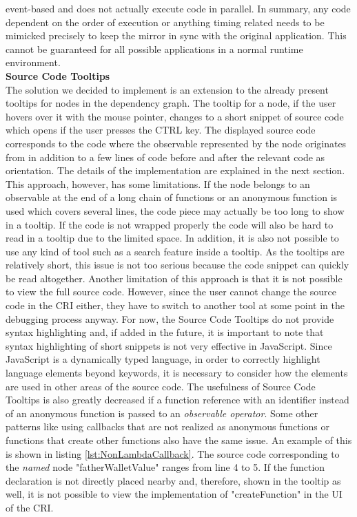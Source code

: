 event-based \cite{EventBasedJS} and does not actually execute code in parallel. In summary, any code dependent on the order of execution or anything timing related needs to be mimicked precisely to keep the mirror in sync with the original application. This cannot be guaranteed for all possible applications in a normal runtime environment. \\
 
\noindent\textbf{Source Code Tooltips}\\
The solution we decided to implement is an extension to the already present tooltips for nodes in the dependency graph. The tooltip for a node, if the user hovers over it with the mouse pointer, changes to a short snippet of source code which opens if the user presses the CTRL key. The displayed source code corresponds to the code where the observable represented by the node originates from in addition to a few lines of code before and after the relevant code as orientation. The details of the implementation are explained in the next section. This approach, however, has some limitations. If the node belongs to an observable at the end of a long chain of functions or an anonymous function is used which covers several lines, the code piece may actually be too long to show in a tooltip. If the code is not wrapped properly the code will also be hard to read in a tooltip due to the limited space. In addition, it is also not possible to use any kind of tool such as a search feature inside a tooltip. As the tooltips are relatively short, this issue is not too serious because the code snippet can quickly be read altogether. Another limitation of this approach is that it is not possible to view the full source code. However, since the user cannot change the source code in the CRI either, they have to switch to another tool at some point in the debugging process anyway. For now, the Source Code Tooltips do not provide syntax highlighting and, if added in the future, it is important to note that syntax highlighting of short snippets is not very effective in JavaScript. Since JavaScript is a dynamically typed language, in order to correctly highlight language elements beyond keywords, it is necessary to consider how the elements are used in other areas of the source code. The usefulness of Source Code Tooltips is also greatly decreased if a function reference with an identifier instead of an anonymous function is passed to an \emph{observable operator}. Some other patterns like using callbacks that are not realized as anonymous functions or functions that create other functions also have the same issue. An example of this is shown in listing \ref{lst:NonLambdaCallback}. The source code corresponding to the \emph{named} node "fatherWalletValue" ranges from line 4 to 5. If the function declaration is not directly placed nearby and, therefore, shown in the tooltip as well, it is not possible to view the implementation of "createFunction" in the UI of the CRI.

